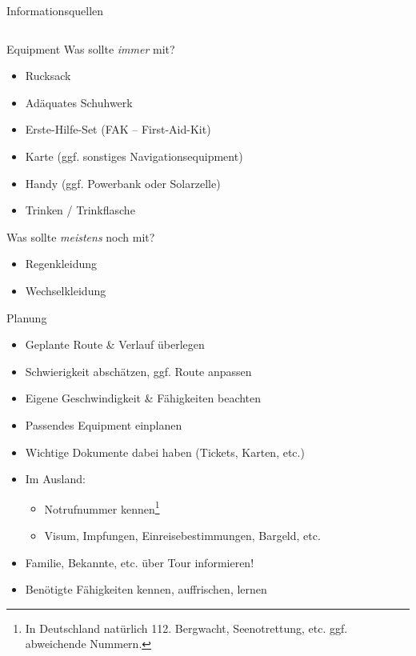 \documentclass{beamer}
\begin{document}
\begin{frame}{Informationsquellen}
\begin{columns}[T]
\begin{column}{0.39\textwidth}
				\end{column}
			\end{columns}
		\end{frame}
		
		\begin{frame}{Equipment}
			Was sollte \textit{immer} mit?
			\begin{itemize}
				\item Rucksack
				\item Adäquates Schuhwerk
				\item Erste-Hilfe-Set (FAK -- First-Aid-Kit)
				\item Karte (ggf. sonstiges Navigationsequipment)
				\item Handy (ggf. Powerbank oder Solarzelle)
				\item Trinken / Trinkflasche
			\end{itemize}\pause
			Was sollte \textit{meistens} noch mit?
			\begin{itemize}
				\item Regenkleidung
				\item Wechselkleidung
			\end{itemize}
		\end{frame}
		
		\begin{frame}{Planung}
			\begin{itemize}
				\item Geplante Route \& Verlauf überlegen
				\item Schwierigkeit abschätzen, ggf. Route anpassen
				\item Eigene Geschwindigkeit \& Fähigkeiten beachten
				\item Passendes Equipment einplanen
				\item Wichtige Dokumente dabei haben (Tickets, Karten, etc.)
				\item Im Ausland:
				\begin{itemize}
					\item Notrufnummer kennen\footnote{In Deutschland natürlich 112. Bergwacht, Seenotrettung, etc. ggf. abweichende Nummern.}
					\item Visum, Impfungen, Einreisebestimmungen, Bargeld, etc.
				\end{itemize}
				\item Familie, Bekannte, etc. über Tour informieren!
				\item Benötigte Fähigkeiten kennen, auffrischen, lernen
			\end{itemize}
		\end{frame}
	
\end{document}
